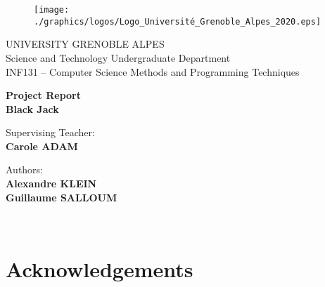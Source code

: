 \documentclass[a4paper, twoside]{report}
\begin{document}





\begin{titlepage}
\begin{figure}[!htb]
    \centering
    \texttt{[image: ./graphics/logos/Logo\_Université\_Grenoble\_Alpes\_2020.eps]}
\end{figure}

\begin{center}
    \LARGE{UNIVERSITY GRENOBLE ALPES}
    \vspace{5mm}
    \\ \large{Science and Technology Undergraduate Department}
    \vspace{5mm}
    \\ \LARGE{INF131 -- Computer Science Methods and Programming Techniques}
\end{center}

\vspace{15mm}
\begin{center}
    {\LARGE{\bf Project Report\\\vspace{5mm}Black Jack}}
\end{center}
\vspace{30mm}

\begin{minipage}[t]{0.47\textwidth}
	{\large{Supervising Teacher:}{\normalsize\vspace{3mm}
	\bf\\ \large{Carole ADAM \vspace{2mm}\\ }}}
\end{minipage}
\hfill
\begin{minipage}[t]{0.47\textwidth}\raggedleft
	{\large{Authors:}{\normalsize\vspace{3mm}
    \bf\\ \large{Alexandre KLEIN \vspace{2mm}\\Guillaume SALLOUM }}}
\end{minipage}

\vspace{30mm}
\hrulefill
\\

\end{titlepage}




\chapter*{Acknowledgements}
\end{document}
